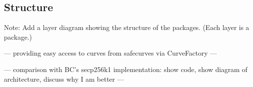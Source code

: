 \subsection{Structure}

Note: Add a layer diagram showing the structure of the packages. (Each layer is a package.)



--- providing easy access to curves from safecurves via CurveFactory ---

--- comparison with BC's secp256k1 implementation: show code, show diagram of architecture, discuss why I am better ---